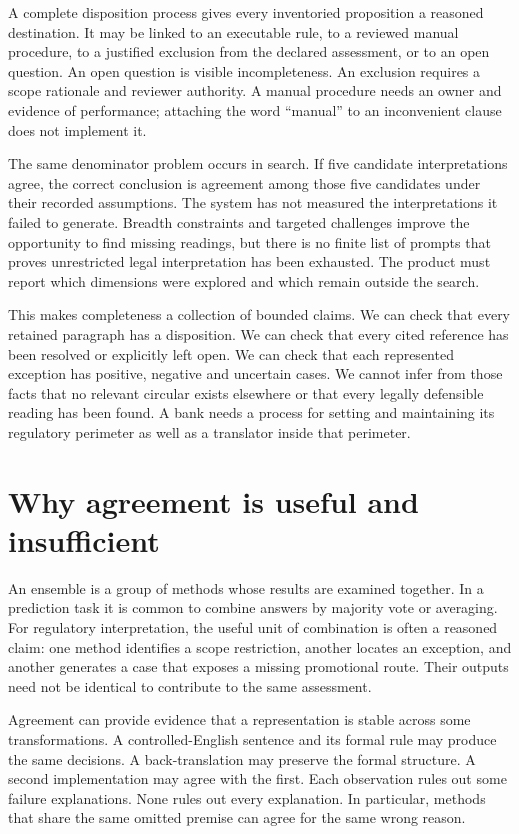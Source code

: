 \documentclass[12pt,a4paper,oneside,openany]{book}
\begin{document}
A complete disposition process gives every inventoried proposition a reasoned
destination. It may be linked to an executable rule, to a reviewed manual
procedure, to a justified exclusion from the declared assessment, or to an open
question. An open question is visible incompleteness. An exclusion requires a
scope rationale and reviewer authority. A manual procedure needs an owner and
evidence of performance; attaching the word ``manual'' to an inconvenient clause
does not implement it.

The same denominator problem occurs in search. If five candidate interpretations
agree, the correct conclusion is agreement among those five candidates under
their recorded assumptions. The system has not measured the interpretations it
failed to generate. Breadth constraints and targeted challenges improve the
opportunity to find missing readings, but there is no finite list of prompts
that proves unrestricted legal interpretation has been exhausted. The product
must report which dimensions were explored and which remain outside the search.

This makes completeness a collection of bounded claims. We can check that every
retained paragraph has a disposition. We can check that every cited reference has
been resolved or explicitly left open. We can check that each represented
exception has positive, negative and uncertain cases. We cannot infer from those
facts that no relevant circular exists elsewhere or that every legally
defensible reading has been found. A bank needs a process for setting and
maintaining its regulatory perimeter as well as a translator inside that perimeter.

\section{Why agreement is useful and insufficient}
\label{sec:problem-agreement}
An ensemble is a group of methods whose results are examined together. In a
prediction task it is common to combine answers by majority vote or averaging.
For regulatory interpretation, the useful unit of combination is often a
reasoned claim: one method identifies a scope restriction, another locates an
exception, and another generates a case that exposes a missing promotional route.
Their outputs need not be identical to contribute to the same assessment.

Agreement can provide evidence that a representation is stable across some
transformations. A controlled-English sentence and its formal rule may produce
the same decisions. A back-translation may preserve the formal structure. A
second implementation may agree with the first. Each observation rules out some
failure explanations. None rules out every explanation. In particular, methods
that share the same omitted premise can agree for the same wrong reason.
\end{document}
